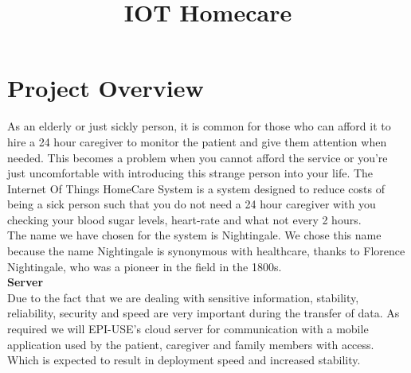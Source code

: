 \documentclass[12pt]{article}
\title{IOT Homecare}
\begin{document}
    \newcommand{\titleimage}{iot.png}
    \newcommand{\titlecompany}{Epi-Use}
    
    
    
	
	\newpage

	\section{Project Overview}
	As an elderly or just sickly person, it is common for those who can afford it to hire a 24 hour caregiver to monitor the patient and give them attention when needed. This becomes a problem when you cannot afford the service or you're just uncomfortable with introducing this strange person into your life. The Internet Of Things HomeCare System is a system designed to reduce costs of being a sick person such that you do not need a 24 hour caregiver with you checking your blood sugar levels, heart-rate and what not every 2 hours. \\
	
	The name we have chosen for the system is Nightingale. We chose this name because the name Nightingale is synonymous with healthcare, thanks to Florence Nightingale, who was a pioneer in the field in the 1800s.\\
	
\textbf{Server}\\
	Due to the fact that we are dealing with sensitive information, stability, reliability, security and speed are very important during the transfer of data. As required we will EPI-USE's cloud server for communication with a mobile application used by the patient, caregiver and family members with access. Which is expected to result in deployment speed and increased stability.\\ 
	
\end{document}
